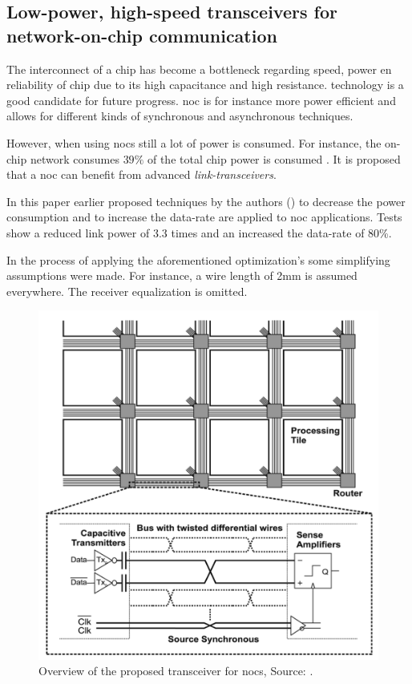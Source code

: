 \subsection{Low-power, high-speed transceivers for network-on-chip
communication \cite{schinkel2009low}} \label{ss:schinkel2009low}
The interconnect of a chip has become a bottleneck regarding speed, power en reliability of chip due to its high capacitance and high resistance.  technology is a good candidate for future progress.
\ac{noc} is for instance more power efficient and allows for different kinds of synchronous and asynchronous techniques.


\motive
However, when using \acsp{noc} still a lot of power is consumed.
For instance, the on-chip network consumes $39\%$ of the total chip power is consumed \cite{vangal20075}.
It is proposed that a \ac{noc} can benefit from advanced \textit{link-transceivers}.

\objective
In this paper earlier proposed techniques by the authors (\cite{mensink20070}) to decrease the power consumption and to increase the data-rate are applied to \ac{noc} applications.
Tests show a reduced link power of 3.3 times and an increased the data-rate of 80\%.

\summary
In the process of applying the aforementioned optimization's some simplifying assumptions were made. 
For instance, a wire length of 2mm is assumed everywhere. 
The receiver equalization is omitted.

\begin{figure}	\centering
	
	\includegraphics[width=0.78\linewidth]{Figures/Rep2Overview.png}
	\caption{Overview of the proposed transceiver for \acsp{noc}, Source: \cite{schinkel2009low}.} 
    \label{fig:rep2:overview}
\end{figure}

